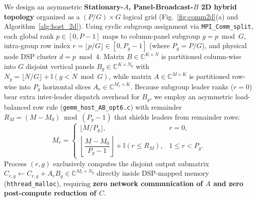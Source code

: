 \documentclass[conference]{IEEEtran}
\begin{document}
We design an asymmetric \textbf{Stationary-$A$, Panel-Broadcast-$B$ 2D hybrid topology} organized as a $(P/G) \times G$ logical grid (Fig.~\ref{fig:comm2d}(a) and Algorithm~\ref{alg:host_2d}). Using cyclic subgroup assignment via \texttt{MPI\_Comm\_split}, each global rank $p \in [0, P-1]$ maps to column-panel subgroup $g = p \bmod G$, intra-group row index $r = \lfloor p / G \rfloor \in [0, P_g - 1]$ (where $P_g = P/G$), and physical node DSP cluster $d = p \bmod 4$. Matrix $B \in \mathbb{C}^{K \times N}$ is partitioned column-wise into $G$ disjoint vertical panels $B_g \in \mathbb{C}^{K \times N_g}$ with $N_g = \lfloor N/G \rfloor + \mathbb{I}(g < N \bmod G)$, while matrix $A \in \mathbb{C}^{M \times K}$ is partitioned row-wise into $P_g$ horizontal slices $A_r \in \mathbb{C}^{M_r \times K}$. Because subgroup leader ranks ($r = 0$) bear extra inter-leader dispatch overhead for $B_g$, we employ an asymmetric load-balanced row rule (\texttt{gemm\_host\_AB\_opt6.c}) with remainder $R_M = (M - M_0) \bmod (P_g - 1)$ that shields leaders from remainder rows:
\begin{equation}
M_r = \begin{cases}
\lfloor M / P_g \rfloor, & r = 0, \\[3pt]
\left\lfloor \dfrac{M - M_0}{P_g - 1} \right\rfloor + \mathbb{I}(r \le R_M), & 1 \le r < P_g.
\end{cases}
\label{eq:row_alloc}
\end{equation}
Process $(r, g)$ exclusively computes the disjoint output submatrix $C_{r,g} \leftarrow C_{r,g} + A_r B_g \in \mathbb{C}^{M_r \times N_g}$ directly inside DSP-mapped memory (\texttt{hthread\_malloc}), requiring \textbf{zero network communication of $A$ and zero post-compute reduction of $C$}.
\end{document}
